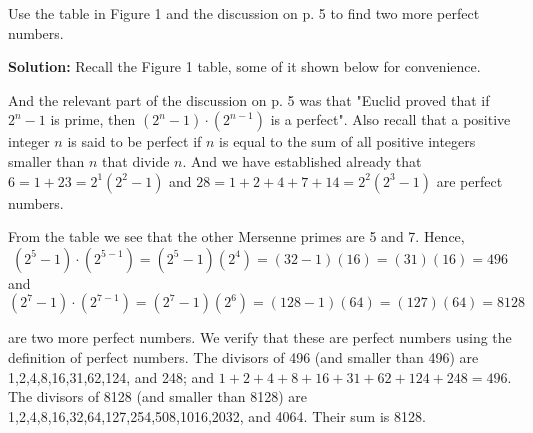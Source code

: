 Use the table in Figure 1 and the discussion on p. 5 to find two more perfect numbers.

\doublespacing

\textbf{Solution:} Recall the Figure 1 table, some of it shown below for convenience. 

\begin{table}[h]
\centering
{}
\end{table}

And the relevant part of the discussion on p. 5 was that "Euclid proved that if $2^n-1$ is prime, then $(2^{n}-1) \cdot (2^{n-1})$ is a perfect". Also recall that a positive integer $n$ is said to be perfect if $n$ is equal to the sum of all positive integers smaller than $n$ that divide $n$. And we have established already that $6=1+23=2^1(2^2-1)$ and $28=1+2+4+7+14=2^2(2^3-1)$ are perfect numbers.

\doublespacing

From the table we see that the other Mersenne primes are 5 and 7. Hence,
$$(2^5-1) \cdot (2^{5-1}) = (2^5-1)(2^4) = (32-1)(16) = (31)(16) = 496$$
and
$$(2^7-1) \cdot (2^{7-1}) = (2^7-1)(2^6) = (128-1)(64) = (127)(64) = 8128$$

are two more perfect numbers. We verify that these are perfect numbers using the definition of perfect numbers. The divisors of 496 (and smaller than 496) are 1,2,4,8,16,31,62,124, and 248; and $1+2+4+8+16+31+62+124+248=496$. The divisors of 8128 (and smaller than 8128) are 1,2,4,8,16,32,64,127,254,508,1016,2032, and 4064. Their sum is 8128.

\pagebreak